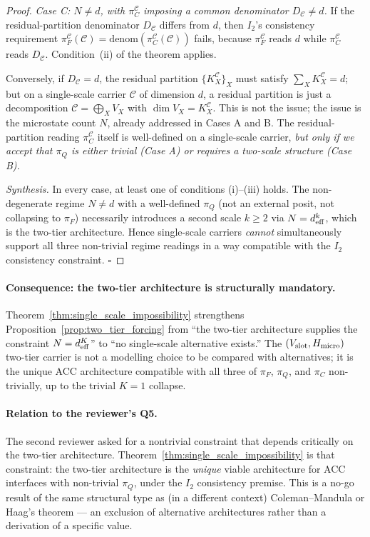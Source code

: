 \documentclass[11pt]{article}
\theoremstyle{plain}
\theoremstyle{definition}
\theoremstyle{remark}
\begin{document}
\begin{proof}
\medskip

\emph{Case C: $N \neq d$, with $\pi_C^{\mathcal{C}}$ imposing a common denominator $D_{\mathcal{C}} \neq d$.}  If the residual-partition denominator $D_{\mathcal{C}}$ differs from $d$, then $I_2$'s consistency requirement $\pi_F^{\mathcal{C}}(\mathcal{C}) = \mathrm{denom}(\pi_C^{\mathcal{C}}(\mathcal{C}))$ fails, because $\pi_F^{\mathcal{C}}$ reads $d$ while $\pi_C^{\mathcal{C}}$ reads $D_{\mathcal{C}}$.  Condition~(ii) of the theorem applies.

Conversely, if $D_{\mathcal{C}} = d$, the residual partition $\{K_X^{\mathcal{C}}\}_X$ must satisfy $\sum_X K_X^{\mathcal{C}} = d$; but on a single-scale carrier $\mathcal{C}$ of dimension $d$, a residual partition is just a decomposition $\mathcal{C} = \bigoplus_X V_X$ with $\dim V_X = K_X^{\mathcal{C}}$.  This is not the issue; the issue is the microstate count $N$, already addressed in Cases A and B.  The residual-partition reading $\pi_C^{\mathcal{C}}$ itself is well-defined on a single-scale carrier, \emph{but only if we accept that $\pi_Q$ is either trivial (Case A) or requires a two-scale structure (Case B).}

\medskip

\emph{Synthesis.}  In every case, at least one of conditions (i)--(iii) holds.  The non-degenerate regime $N \neq d$ with a well-defined $\pi_Q$ (not an external posit, not collapsing to $\pi_F$) necessarily introduces a second scale $k \geq 2$ via $N = d_{\rm eff}^k$, which is the two-tier architecture.  Hence single-scale carriers \emph{cannot} simultaneously support all three non-trivial regime readings in a way compatible with the $I_2$ consistency constraint.  $\square$
\end{proof}

\paragraph{Consequence: the two-tier architecture is structurally mandatory.}  Theorem~\ref{thm:single_scale_impossibility} strengthens Proposition~\ref{prop:two_tier_forcing} from ``the two-tier architecture supplies the constraint $N = d_{\rm eff}^K$'' to ``no single-scale alternative exists.''  The $(V_{\rm slot}, H_{\rm micro})$ two-tier carrier is not a modelling choice to be compared with alternatives; it is the unique ACC architecture compatible with all three of $\pi_F$, $\pi_Q$, and $\pi_C$ non-trivially, up to the trivial $K = 1$ collapse.

\paragraph{Relation to the reviewer's Q5.}  The second reviewer asked for a nontrivial constraint that depends critically on the two-tier architecture.  Theorem~\ref{thm:single_scale_impossibility} is that constraint: the two-tier architecture is the \emph{unique} viable architecture for ACC interfaces with non-trivial $\pi_Q$, under the $I_2$ consistency premise.  This is a no-go result of the same structural type as (in a different context) Coleman--Mandula or Haag's theorem --- an exclusion of alternative architectures rather than a derivation of a specific value.
\end{document}
